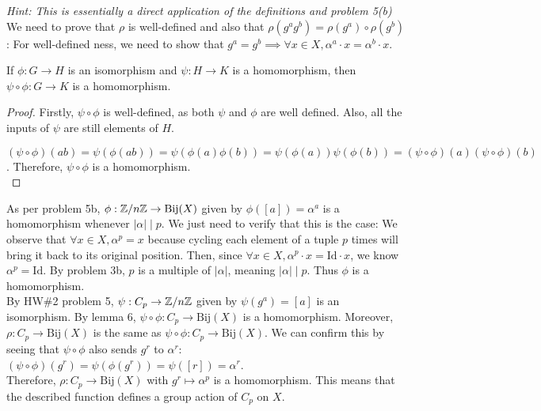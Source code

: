 \documentclass{amsart}
\begin{document}
\begin{enumerate}[itemsep=0.4in]
 \emph{Hint: This is essentially a direct application of the definitions and problem 5(b)}\\

We need to prove that $\rho$ is well-defined and also that $\rho(g^ag^b)=\rho(g^a)\circ\rho(g^b)$: For well-defined ness, we need to show that $g^a=g^b\implies \forall x\in X,\alpha^a\cdot x=\alpha^b\cdot x$.\\

\begin{lemma}
    If $\phi:G\to H$ is an isomorphism and $\psi:H\to K$ is a homomorphism, then $\psi\circ\phi:G\to K$ is a homomorphism.
\end{lemma}

\begin{proof}
    Firstly, $\psi\circ\phi$ is well-defined, as both $\psi$ and $\phi$ are well defined. Also, all the inputs of $\psi$ are still elements of $H$.

    $(\psi\circ\phi)(ab)=\psi(\phi(ab))=\psi(\phi(a)\phi(b))=\psi(\phi(a))\psi(\phi(b))=(\psi\circ\phi)(a)(\psi\circ\phi)(b)$. Therefore, $\psi\circ\phi$ is a homomorphism. \\
\end{proof}

As per problem 5b, $\phi:\mathbb{Z}/n\mathbb{Z}\to\mathrm{Bij}(X)$ given by $\phi([a])=\alpha^a$ is a homomorphism whenever $|\alpha|\mid p$.  We just need to verify that this is the case: We observe that $\forall x\in X,\alpha^p=x$ because cycling each element of a tuple $p$ times will bring it back to its original position. Then, since $\forall x\in X,\alpha^p\cdot x=\mathrm{Id}\cdot x$, we know $\alpha^p=\mathrm{Id}$. By problem 3b, $p$ is a multiple of $|\alpha|$, meaning $|\alpha|\mid p$. Thus $\phi$ is a homomorphism.\\

By HW\#2 problem 5, $\psi:C_p\to\mathbb{Z}/n\mathbb{Z}$ given by $\psi(g^a)=[a]$ is an isomorphism. By lemma 6, $\psi\circ\phi:C_p\to\mathrm{Bij}(X)$ is a homomorphism. Moreover, $\rho:C_p\to\mathrm{Bij}(X)$ is the same as $\psi\circ\phi:C_p\to\mathrm{Bij}(X)$. We can confirm this by seeing that $\psi\circ\phi$ also sends $g^r$ to $\alpha^r$: $(\psi\circ\phi)(g^r)=\psi(\phi(g^r))=\psi([r])=\alpha^r$.\\

Therefore, $\rho:C_p\to\mathrm{Bij}(X)$ with $g^r\mapsto\alpha^p$ is a homomorphism. This means that the described function defines a group action of $C_p$ on $X$.

\end{enumerate}
\end{document}
